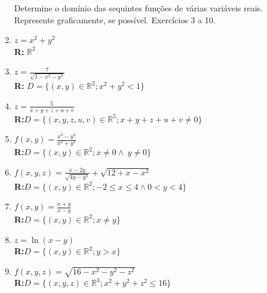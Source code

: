 \documentclass[oneside,a4paper,12pt]{article}
\begin{document}
\begin{enumerate}
	Determine o domínio das sequintes funções de várias variáveis reais. Represente graficamente, se possível. Exercícios 3 a 10.
            \item $z = x^2+y^2$ \\{\bf R:} $\mathbb{R}^2$
            \item $z = \displaystyle \frac{7}{\sqrt{1-x^2-y^2}}$\\{\bf R:} $D=\{(x,y)\in\mathbb{R}^2;x^2+y^2<1\}$
            \item $z=\displaystyle\frac{5}{x+y+z+u+v}$\\{\bf R:}$D=\{(x,y,z,u,v)\in\mathbb{R}^5;x+y+z+u+v \neq 0\}$
            \item $f(x,y)=\displaystyle\frac{x^2-y^2}{x^2+y^2}$\\{\bf R:}$D=\{(x,y)\in\mathbb{R}^2;x\neq0\land~y\neq0\}$
            \item $f(x,y,z) = \displaystyle\frac{x-2y}{\sqrt{4y-y^2}}+\sqrt{12+x-x^2}$\\{\bf R:}$D=\{(x,y)\in\mathbb{R}^2;-2\leq x\leq4 \land 0<y<4\}$
            \item $f(x,y) = \displaystyle\frac{x+y}{x-y}$\\{\bf R:}$D=\{(x,y)\in\mathbb{R}^2;x\neq y\}$
            \item $z=\ln(x-y)$\\{\bf R:}$D=\{(x,y)\in\mathbb{R}^2;y> x\}$
            \item $f(x,y,z) = \sqrt{16-x^2-y^2-z^2}$\\{\bf R:}$D=\{(x,y,z)\in\mathbb{R}^3;x^2+y^2+z^2\leq16\}$
    

\end{enumerate}
\end{document}
